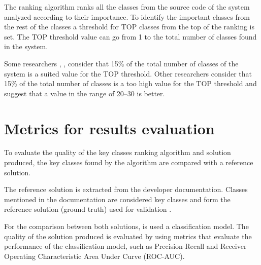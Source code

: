 \documentclass[12pt, a4paper, twoside]{report}
\begin{document}
The ranking algorithm ranks all the classes from the source code of the system analyzed according to their importance. To identify the important classes from the rest of the classes a threshold for TOP classes from the top of the ranking is set. The TOP threshold value can go from 1 to the total number of classes found in the system. 

Some researchers \cite{ZaidmanJurnal}, \cite{Ding2016AnIA}, \cite{PAN2018188} consider that 15\% of the total number of classes of the system is a suited value for the TOP threshold. Other researchers \cite{Finding-key-classes} consider that 15\% of the total number of classes is a too high value for the TOP threshold and suggest that a value in the range of 20–30 is better.


\section{Metrics for results evaluation}
\label{sec:evalmetrics}
To evaluate the quality of the key classes ranking algorithm and solution produced, the key classes found by the algorithm are compared with a reference solution.

The reference solution is extracted from the developer documentation.  Classes mentioned in the documentation are considered key classes and form the reference solution (ground truth) used for validation \cite{7551990}. 


For the comparison between both solutions, is used a classification model. The quality of the solution produced is evaluated by using metrics that evaluate the performance of the classification model, such as Precision-Recall and Receiver Operating Characteristic Area Under Curve (ROC-AUC).
\end{document}
